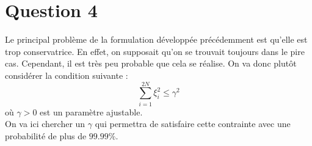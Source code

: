 \section*{Question 4}

Le principal problème de la formulation développée précédemment est qu'elle est trop conservatrice. En effet, on supposait qu'on se trouvait toujours dans le pire cas. Cependant, il est très peu probable que cela se réalise. On va donc plutôt considérer la condition suivante : $$\sum_{i=1}^{2N}{\xi_i^2} \leq \gamma^2$$ où $\gamma > 0$ est un paramètre ajustable.\\
On va ici chercher un $\gamma$ qui permettra de satisfaire cette contrainte avec une probabilité de plus de $99.99\%$.